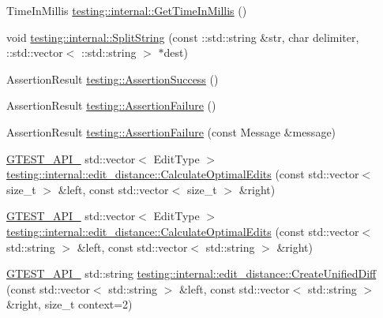 \begin{DoxyCompactItemize}
\item 
Time\+In\+Millis \mbox{\hyperlink{namespacetesting_1_1internal_ae66b46943a429e6efb1db456d4cae90c}{testing\+::internal\+::\+Get\+Time\+In\+Millis}} ()
\item 
void \mbox{\hyperlink{namespacetesting_1_1internal_a8eb8eddf760375a490e007b20777ec56}{testing\+::internal\+::\+Split\+String}} (const \+::std\+::string \&str, char delimiter, \+::std\+::vector$<$ \+::std\+::string $>$ $\ast$dest)
\item 
Assertion\+Result \mbox{\hyperlink{namespacetesting_ac1d0baedb17286c5c6c87bd1a45da8ac}{testing\+::\+Assertion\+Success}} ()
\item 
Assertion\+Result \mbox{\hyperlink{namespacetesting_a75cb789614cb1c28c34627a4a3c053df}{testing\+::\+Assertion\+Failure}} ()
\item 
Assertion\+Result \mbox{\hyperlink{namespacetesting_a56f59110a218942d2fc4695914b1685c}{testing\+::\+Assertion\+Failure}} (const Message \&message)
\item 
\mbox{\hyperlink{_obj__test_2lib_2googletest-release-1_88_81_2googletest_2include_2gtest_2internal_2gtest-port_8h_aa73be6f0ba4a7456180a94904ce17790}{G\+T\+E\+S\+T\+\_\+\+A\+P\+I\+\_\+}} std\+::vector$<$ Edit\+Type $>$ \mbox{\hyperlink{namespacetesting_1_1internal_1_1edit__distance_a26323b4c2a29ea8e187aafbd4d2275db}{testing\+::internal\+::edit\+\_\+distance\+::\+Calculate\+Optimal\+Edits}} (const std\+::vector$<$ size\+\_\+t $>$ \&left, const std\+::vector$<$ size\+\_\+t $>$ \&right)
\item 
\mbox{\hyperlink{_obj__test_2lib_2googletest-release-1_88_81_2googletest_2include_2gtest_2internal_2gtest-port_8h_aa73be6f0ba4a7456180a94904ce17790}{G\+T\+E\+S\+T\+\_\+\+A\+P\+I\+\_\+}} std\+::vector$<$ Edit\+Type $>$ \mbox{\hyperlink{namespacetesting_1_1internal_1_1edit__distance_a32267b2ae24de1de175ac8217406877d}{testing\+::internal\+::edit\+\_\+distance\+::\+Calculate\+Optimal\+Edits}} (const std\+::vector$<$ std\+::string $>$ \&left, const std\+::vector$<$ std\+::string $>$ \&right)
\item 
\mbox{\hyperlink{_obj__test_2lib_2googletest-release-1_88_81_2googletest_2include_2gtest_2internal_2gtest-port_8h_aa73be6f0ba4a7456180a94904ce17790}{G\+T\+E\+S\+T\+\_\+\+A\+P\+I\+\_\+}} std\+::string \mbox{\hyperlink{namespacetesting_1_1internal_1_1edit__distance_ac4c24a581ff433d7aca7ed12c9133fb1}{testing\+::internal\+::edit\+\_\+distance\+::\+Create\+Unified\+Diff}} (const std\+::vector$<$ std\+::string $>$ \&left, const std\+::vector$<$ std\+::string $>$ \&right, size\+\_\+t context=2)

\end{DoxyCompactItemize}
